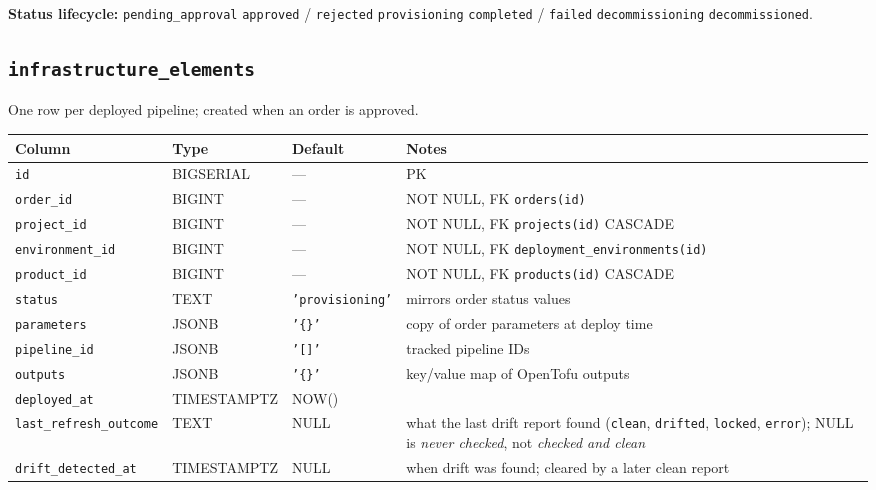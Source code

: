 \documentclass[12pt,a4paper,twoside]{report}
\newcommand{\code}[1]{\texttt{#1}}
\begin{document}
\noindent\textbf{Status lifecycle:}
\code{pending\_approval} \textrightarrow{} \code{approved} / \code{rejected}
\textrightarrow{} \code{provisioning} \textrightarrow{} \code{completed} / \code{failed}
\textrightarrow{} \code{decommissioning} \textrightarrow{} \code{decommissioned}.

\subsection*{\texttt{infrastructure\_elements}}

One row per deployed pipeline; created when an order is approved.

\begin{table}[H]
  \centering\small
  \begin{tabular}{@{}llll@{}}
    \toprule
    \textbf{Column} & \textbf{Type} & \textbf{Default} & \textbf{Notes} \\
    \midrule
    \code{id}             & BIGSERIAL   & ---         & PK \\
    \code{order\_id}      & BIGINT      & ---         & NOT NULL, FK \textrightarrow{} \code{orders(id)} \\
    \code{project\_id}    & BIGINT      & ---         & NOT NULL, FK \textrightarrow{} \code{projects(id)} CASCADE \\
    \code{environment\_id}& BIGINT      & ---         & NOT NULL, FK \textrightarrow{} \code{deployment\_environments(id)} \\
    \code{product\_id}    & BIGINT      & ---         & NOT NULL, FK \textrightarrow{} \code{products(id)} CASCADE \\
    \code{status}         & TEXT        & \code{'provisioning'} & mirrors order status values \\
    \code{parameters}     & JSONB       & \code{'\{\}'} & copy of order parameters at deploy time \\
    \code{pipeline\_id}   & JSONB       & \code{'[]'} & tracked pipeline IDs \\
    \code{outputs}        & JSONB       & \code{'\{\}'} & key/value map of OpenTofu outputs \\
    \code{deployed\_at}   & TIMESTAMPTZ & NOW()       & \\
    \code{last\_refresh\_outcome} & TEXT & NULL & what the last drift report found (\code{clean}, \code{drifted}, \code{locked}, \code{error}); NULL is \emph{never checked}, not \emph{checked and clean} \\
    \code{drift\_detected\_at}    & TIMESTAMPTZ & NULL & when drift was found; cleared by a later clean report \\

\end{tabular}
\end{table}
\end{document}
